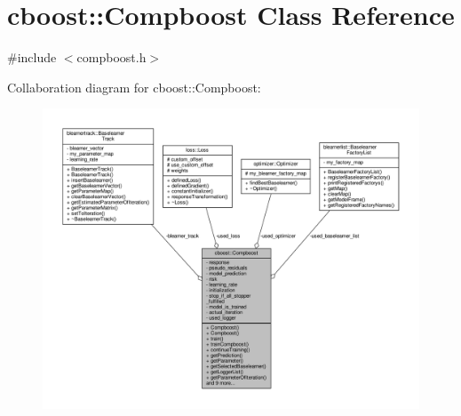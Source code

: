 \hypertarget{classcboost_1_1_compboost}{}\section{cboost\+:\+:Compboost Class Reference}
\label{classcboost_1_1_compboost}


{\ttfamily \#include $<$compboost.\+h$>$}



Collaboration diagram for cboost\+:\+:Compboost\+:\nopagebreak
\begin{figure}[H]
\begin{center}
\leavevmode
\includegraphics[width=350pt]{classcboost_1_1_compboost__coll__graph}
\end{center}
\end{figure}
